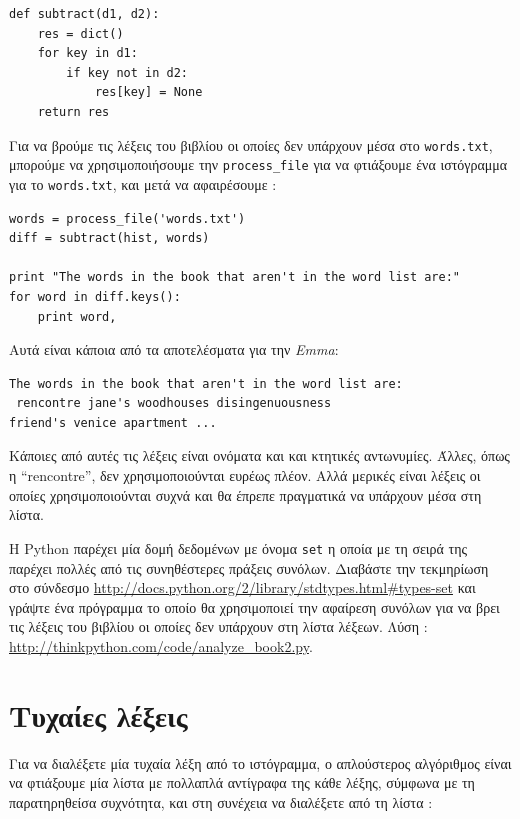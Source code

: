 \documentclass[10pt]{book}
\begin{document}
\begin{verbatim}
def subtract(d1, d2):
    res = dict()
    for key in d1:
        if key not in d2:
            res[key] = None
    return res
\end{verbatim}
%
 Για να βρούμε τις λέξεις του βιβλίου οι οποίες δεν υπάρχουν μέσα στο  {\tt words.txt},  μπορούμε να χρησιμοποιήσουμε 
την  \verb"process_file"  για να φτιάξουμε ένα ιστόγραμμα για το  {\tt words.txt},  και μετά να αφαιρέσουμε :

\begin{verbatim}
words = process_file('words.txt')
diff = subtract(hist, words)

print "The words in the book that aren't in the word list are:"
for word in diff.keys():
    print word,
\end{verbatim}
%
 Αυτά είναι κάποια από τα αποτελέσματα για την  {\em Emma}: 

\begin{verbatim}
The words in the book that aren't in the word list are:
 rencontre jane's woodhouses disingenuousness
friend's venice apartment ...
\end{verbatim}
%
 Κάποιες από αυτές τις λέξεις είναι ονόματα και και κτητικές αντωνυμίες. Άλλες, όπως η  ``rencontre'',  δεν χρησιμοποιούνται ευρέως πλέον. Αλλά μερικές είναι λέξεις οι οποίες χρησιμοποιούνται συχνά και θα έπρεπε πραγματικά να υπάρχουν μέσα στη λίστα.

\begin{exercise}

Η  Python  παρέχει μία δομή δεδομένων με όνομα  {\tt set}  η οποία με τη σειρά της παρέχει πολλές από τις συνηθέστερες πράξεις συνόλων. Διαβάστε την τεκμηρίωση στο σύνδεσμο  \url{http://docs.python.org/2/library/stdtypes.html#types-set}  και γράψτε ένα πρόγραμμα το οποίο θα χρησιμοποιεί την αφαίρεση συνόλων για να βρει τις λέξεις του βιβλίου οι οποίες δεν υπάρχουν στη λίστα λέξεων. Λύση :  \url{http://thinkpython.com/code/analyze_book2.py}.
\end{exercise}

 
\section{Τυχαίες λέξεις}
\label{randomwords}

Για να διαλέξετε μία τυχαία λέξη από το ιστόγραμμα, ο απλούστερος αλγόριθμος είναι 
να φτιάξουμε μία λίστα με πολλαπλά αντίγραφα της κάθε λέξης, σύμφωνα με τη παρατηρηθείσα συχνότητα, και στη συνέχεια να διαλέξετε από τη λίστα :
\end{document}
